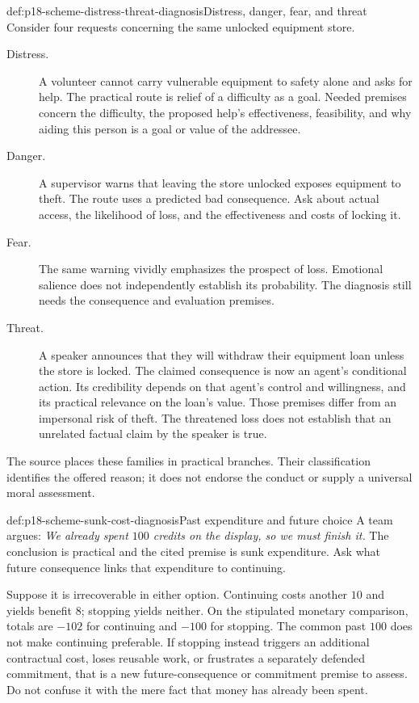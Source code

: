 \begin{hbexample}{def:p18-scheme-distress-threat-diagnosis}{Distress, danger, fear, and threat}
Consider four requests concerning the same unlocked equipment store.
\begin{description}
\item[Distress.] A volunteer cannot carry vulnerable equipment to safety
alone and asks for help. The practical route is relief of a difficulty
as a goal. Needed premises concern the difficulty, the proposed help's
effectiveness, feasibility, and why aiding this person is a goal or
value of the addressee.
\item[Danger.] A supervisor warns that leaving the store unlocked
exposes equipment to theft. The route uses a predicted bad consequence.
Ask about actual access, the likelihood of loss, and the effectiveness
and costs of locking it.
\item[Fear.] The same warning vividly emphasizes the prospect of loss.
Emotional salience does not independently establish its probability.
The diagnosis still needs the consequence and evaluation premises.
\item[Threat.] A speaker announces that they will withdraw their
equipment loan unless the store is locked. The claimed consequence
is now an agent's conditional action. Its credibility depends on
that agent's control and willingness, and its practical relevance
on the loan's value. Those premises differ from an impersonal risk
of theft. The threatened loss does not establish that an unrelated
factual claim by the speaker is true.
\end{description}
The source places these families in practical branches. Their
classification identifies the offered reason; it does not endorse
the conduct or supply a universal moral assessment.
\end{hbexample}

\begin{hbexample}{def:p18-scheme-sunk-cost-diagnosis}{Past expenditure and future choice}
A team argues: \emph{We already spent \(100\) credits on the display,
so we must finish it.} The conclusion is practical and the cited
premise is sunk expenditure. Ask what future consequence links
that expenditure to continuing.

Suppose it is irrecoverable in either option. Continuing costs
another \(10\) and yields benefit \(8\); stopping yields neither.
On the stipulated monetary comparison, totals are \(-102\) for
continuing and \(-100\) for stopping. The common past \(100\)
does not make continuing preferable. If stopping instead triggers
an additional contractual cost, loses reusable work, or frustrates
a separately defended commitment, that is a new future-consequence
or commitment premise to assess. Do not confuse it with the
mere fact that money has already been spent.
\end{hbexample}

